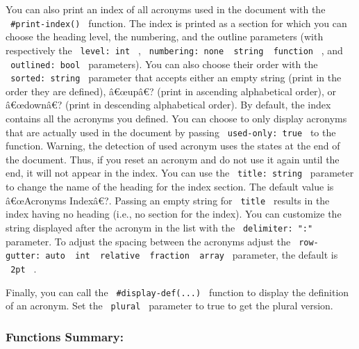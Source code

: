 You can also print an index of all acronyms used in the document with
the \texttt{\ \#print-index()\ } function. The index is printed as a
section for which you can choose the heading level, the numbering, and
the outline parameters (with respectively the \texttt{\ level:\ int\ } ,
\texttt{\ numbering:\ none\ \textbar{}\ string\ \textbar{}\ function\ }
, and \texttt{\ outlined:\ bool\ } parameters). You can also choose
their order with the \texttt{\ sorted:\ string\ } parameter that accepts
either an empty string (print in the order they are defined), â€œupâ€?
(print in ascending alphabetical order), or â€œdownâ€? (print in
descending alphabetical order). By default, the index contains all the
acronyms you defined. You can choose to only display acronyms that are
actually used in the document by passing \texttt{\ used-only:\ true\ }
to the function. Warning, the detection of used acronym uses the states
at the end of the document. Thus, if you reset an acronym and do not use
it again until the end, it will not appear in the index. You can use the
\texttt{\ title:\ string\ } parameter to change the name of the heading
for the index section. The default value is â€œAcronyms Indexâ€?.
Passing an empty string for \texttt{\ title\ } results in the index
having no heading (i.e., no section for the index). You can customize
the string displayed after the acronym in the list with the
\texttt{\ delimiter:\ ":"\ } parameter. To adjust the spacing between
the acronyms adjust the
\texttt{\ row-gutter:\ auto\ \textbar{}\ int\ \textbar{}\ relative\ \textbar{}\ fraction\ \textbar{}\ array\ }
parameter, the default is \texttt{\ 2pt\ } .

Finally, you can call the \texttt{\ \#display-def(...)\ } function to
display the definition of an acronym. Set the \texttt{\ plural\ }
parameter to true to get the plural version.

\subsubsection{Functions Summary:}\label{functions-summary}

